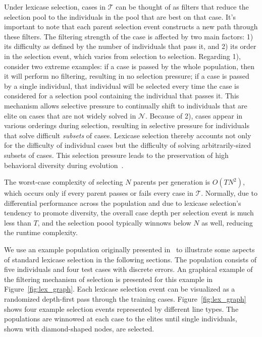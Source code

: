 \documentclass[twoside]{article}
\begin{document}
Under lexicase selection, cases in $\mathcal{T}$ can be thought of as filters that reduce the selection pool to the individuals in the pool that are best on that case. It's important to note that each parent selection event constructs a new path through these filters. The filtering strength of the case is affected by two main factors: 1) its difficulty as defined by the number of individuals that pass it, and 2) its order in the selection event, which varies from selection to selection. Regarding 1), consider two extreme examples: if a case is passed by the whole population, then it will perform no filtering, resulting in no selection pressure; if a case is passed by a single individual, that individual will be selected every time the case is considered for a selection pool containing the individual that passes it. This mechanism allows selective pressure to continually shift to individuals that are elite on cases that are not widely solved in $\mathcal{N}$. Because of 2), cases appear in various orderings during selection, resulting in selective pressure for individuals that solve difficult {\it subsets} of cases. Lexicase selection thereby accounts not only for the difficulty of individual cases but the difficulty of solving arbitrarily-sized subsets of cases. This selection pressure leads to the preservation of high behavioral diversity during evolution~\citep{helmuth_solving_2014, la_cava_epsilon-lexicase_2016}. 

The worst-case complexity of selecting $N$ parents per generation is $O(TN^2)$, which occurs only if every parent passes or fails every case in $\mathcal{T}$. Normally, due to differential performance across the population and due to lexicase selection's tendency to promote diversity, the overall case depth per selection event is much less than $T$, and the selection poool typically winnows below $N$ as well, reducing the runtime complexity\citep{helmuth_solving_2014}. 

We use an example population originally presented in~\citep{spector_assessment_2012} to illustrate some aspects of standard lexicase selection in the following sections. The population consists of five individuals and four test cases with discrete errors. An graphical example of the filtering mechanism of selection is presented for this example in Figure~\ref{fig:lex_graph}. Each lexicase selection event can be visualized as a randomized depth-first pass through the training cases. Figure~\ref{fig:lex_graph} shows four example selection events represented by different line types. The populations are winnowed at each case to the elites until single individuals, shown with diamond-shaped nodes, are selected. 
\end{document}
